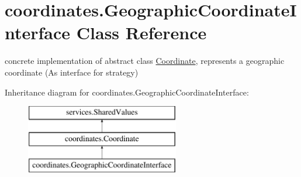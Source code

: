 \hypertarget{classcoordinates_1_1_geographic_coordinate_interface}{}\section{coordinates.\+Geographic\+Coordinate\+Interface Class Reference}
\label{classcoordinates_1_1_geographic_coordinate_interface}


concrete implementation of abstract class \hyperlink{classcoordinates_1_1_coordinate}{Coordinate}, represents a geographic coordinate (As interface for strategy)~\newline
  


Inheritance diagram for coordinates.\+Geographic\+Coordinate\+Interface\+:\begin{figure}[H]
\begin{center}
\leavevmode
\includegraphics[height=3.000000cm]{classcoordinates_1_1_geographic_coordinate_interface}
\end{center}
\end{figure}

